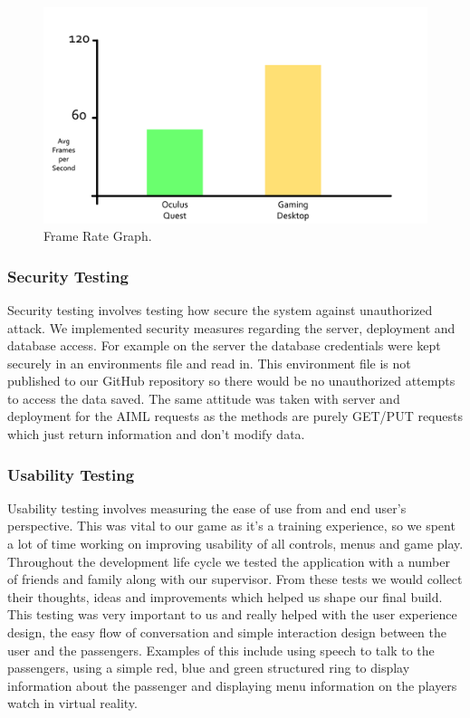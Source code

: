 \begin{figure}[h!]
	\caption{Frame Rate Graph.}
	\label{image:graph1}
	\centering
	\includegraphics[width=1\textwidth]{Images/framerate.png}
\end{figure}
\clearpage

\subsubsection{Security Testing}
Security testing involves testing how secure the system against unauthorized attack. We implemented security measures regarding the server, deployment and database access. For example on the server the database credentials were kept securely in an environments file and read in. This environment file is not published to our GitHub repository so there would be no unauthorized attempts to access the data saved. The same attitude was taken with server and deployment for the AIML requests as the methods are purely GET/PUT requests which just return information and don't modify data.

\subsubsection{Usability Testing}
Usability testing involves measuring the ease of use from and end user’s perspective. This was vital to our game as it's a training experience, so we spent a lot of time working on improving usability of all controls, menus and game play. Throughout the development life cycle we tested the application with a number of friends and family along with our supervisor. From these tests we would collect their thoughts, ideas and improvements which helped us shape our final build. This testing was very important to us and really helped with the user experience design, the easy flow of conversation and simple interaction design between the user and the passengers. Examples of this include using speech to talk to the passengers, using a simple red, blue and green structured ring to display information about the passenger and displaying menu information on the players watch in virtual reality.

